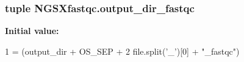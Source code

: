 \subsubsection[{\texorpdfstring{output\+\_\+dir\+\_\+fastqc}{output_dir_fastqc}}]{\setlength{\rightskip}{0pt plus 5cm}tuple N\+G\+S\+Xfastqc.\+output\+\_\+dir\+\_\+fastqc}\hypertarget{namespaceNGSXfastqc_ae219cdd1ea511ecbceadc8409b000616}{}\label{namespaceNGSXfastqc_ae219cdd1ea511ecbceadc8409b000616}
{\bfseries Initial value\+:}
\begin{DoxyCode}
1 = (output\_dir + OS\_SEP +
2                                     file.split(\textcolor{stringliteral}{'\_'})[0] + \textcolor{stringliteral}{"\_fastqc"})
\end{DoxyCode}
